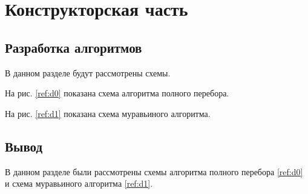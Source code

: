 \chapter{Конструкторская часть}
\label{cha:design}

\section{Разработка алгоритмов}

В данном разделе будут рассмотрены схемы.

На рис. \ref{ref:d0} показана схема алгоритма полного перебора.

\begin{figure}[ht!]
\end{figure}

На рис. \ref{ref:d1} показана схема муравьиного алгоритма.

\begin{figure}[ht!]
\end{figure}

\section{Вывод}

В данном разделе были рассмотрены схемы алгоритма полного перебора \ref{ref:d0}
и схема муравьиного алгоритма \ref{ref:d1}.







